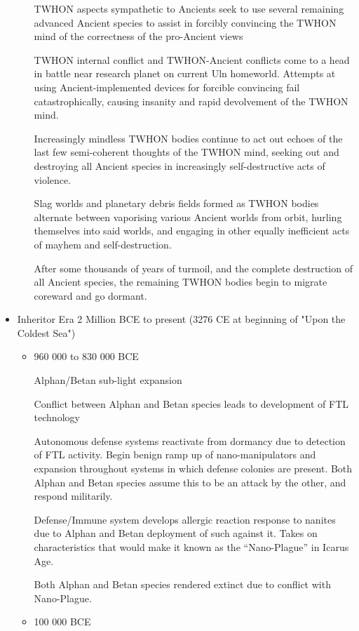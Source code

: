 \begin{itemize}
\begin{itemize}
TWHON aspects sympathetic to Ancients seek to use several remaining
advanced Ancient species to assist in forcibly convincing the TWHON
mind of the correctness of the pro-Ancient views

TWHON internal conflict and TWHON-Ancient conflicts come to a head in
battle near research planet on current Uln homeworld. Attempts at
using Ancient-implemented devices for forcible convincing fail
catastrophically, causing insanity and rapid devolvement of the TWHON
mind.

Increasingly mindless TWHON bodies continue to act out echoes of the
last few semi-coherent thoughts of the TWHON mind, seeking out and
destroying all Ancient species in increasingly self-destructive acts
of violence.

Slag worlds and planetary debris fields formed as TWHON bodies
alternate between vaporising various Ancient worlds from orbit,
hurling themselves into said worlds, and engaging in other equally
inefficient acts of mayhem and self-destruction.

After some thousands of years of turmoil, and the complete destruction
of all Ancient species, the remaining TWHON bodies begin to migrate
coreward and go dormant.

\end{itemize}
\item Inheritor Era  2 Million BCE to present (3276 CE at beginning of "Upon the Coldest Sea")
\begin{itemize}
\item	 960 000 to  830 000 BCE 

Alphan/Betan sub-light expansion 

Conflict between Alphan and Betan species leads to development of FTL technology 

Autonomous defense systems reactivate from dormancy due to detection
of FTL activity. Begin benign ramp up of nano-manipulators and
expansion throughout systems in which defense colonies are present.
Both Alphan and Betan species assume this to be an attack by the
other, and respond militarily.

Defense/Immune system develops allergic reaction response to nanites
due to Alphan and Betan deployment of such against it. Takes on
characteristics that would make it known as the ``Nano-Plague'' in Icarus Age.

Both Alphan and Betan species rendered extinct due to conflict with Nano-Plague. 
\item	 100 000 BCE 


\end{itemize}
\end{itemize}
